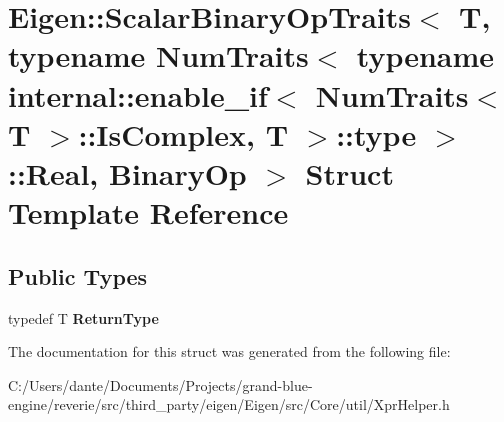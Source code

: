 \hypertarget{struct_eigen_1_1_scalar_binary_op_traits_3_01_t_00_01typename_01_num_traits_3_01typename_01inter6d9b2ba43c8f599c26e1e5ea9727da7f}{}\section{Eigen\+::Scalar\+Binary\+Op\+Traits$<$ T, typename Num\+Traits$<$ typename internal\+::enable\+\_\+if$<$ Num\+Traits$<$ T $>$\+::Is\+Complex, T $>$\+::type $>$\+::Real, Binary\+Op $>$ Struct Template Reference}
\label{struct_eigen_1_1_scalar_binary_op_traits_3_01_t_00_01typename_01_num_traits_3_01typename_01inter6d9b2ba43c8f599c26e1e5ea9727da7f}
\subsection*{Public Types}
\begin{DoxyCompactItemize}
\item 
\mbox{\label{struct_eigen_1_1_scalar_binary_op_traits_3_01_t_00_01typename_01_num_traits_3_01typename_01inter6d9b2ba43c8f599c26e1e5ea9727da7f_ac255ba4c0d28dd1d600d3220dc31d078}} 
typedef T {\bfseries Return\+Type}
\end{DoxyCompactItemize}


The documentation for this struct was generated from the following file\+:\begin{DoxyCompactItemize}
\item 
C\+:/\+Users/dante/\+Documents/\+Projects/grand-\/blue-\/engine/reverie/src/third\+\_\+party/eigen/\+Eigen/src/\+Core/util/Xpr\+Helper.\+h\end{DoxyCompactItemize}
